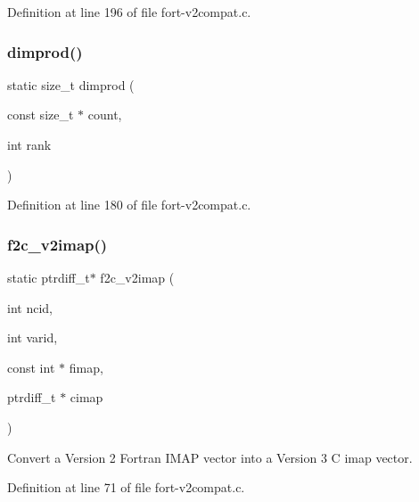 Definition at line 196 of file fort-\/v2compat.\+c.

\mbox{\label{fort-v2compat_8c_aa8270ec7619e957c0db032b4eb46c910}} 
\subsubsection{\texorpdfstring{dimprod()}{dimprod()}}
{\footnotesize\ttfamily static size\+\_\+t dimprod (\begin{DoxyParamCaption}\item[{const size\+\_\+t $\ast$}]{count,  }\item[{int}]{rank }\end{DoxyParamCaption})\hspace{0.3cm}{\ttfamily [static]}}



Definition at line 180 of file fort-\/v2compat.\+c.

\mbox{\label{fort-v2compat_8c_a0c06fd2f546418d0ed6fcfdc21340157}} 
\subsubsection{\texorpdfstring{f2c\+\_\+v2imap()}{f2c\_v2imap()}}
{\footnotesize\ttfamily static ptrdiff\+\_\+t$\ast$ f2c\+\_\+v2imap (\begin{DoxyParamCaption}\item[{int}]{ncid,  }\item[{int}]{varid,  }\item[{const int $\ast$}]{fimap,  }\item[{ptrdiff\+\_\+t $\ast$}]{cimap }\end{DoxyParamCaption})\hspace{0.3cm}{\ttfamily [static]}}



Convert a Version 2 Fortran I\+M\+AP vector into a Version 3 C imap vector. 



Definition at line 71 of file fort-\/v2compat.\+c.

\mbox{\label{fort-v2compat_8c_ae1d820f1518e8d3f5c4a8dd91022a400}} 
